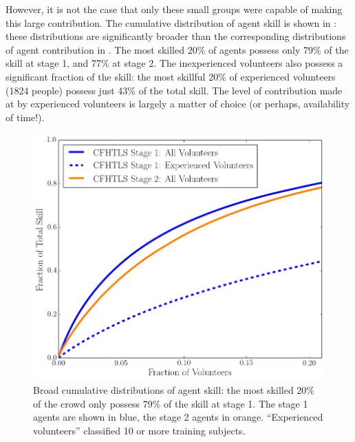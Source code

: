 \documentclass[useAMS,usenatbib,a4paper]{mn2e}
\begin{document}
However, it is not the case that only these small groups were capable of
making this large contribution.
The cumulative distribution of agent skill is shown in
: these distributions are significantly broader
than the corresponding distributions of agent contribution in 
. The most skilled 20\% of agents possess only  79\%
of the skill at stage 1, and 77\% at stage 2. The inexperienced volunteers
also possess a significant fraction of the skill: the most skillful 20\% of
experienced volunteers (1824 people)  possess just 43\% of the total skill.
The level of contribution made at \sw by experienced volunteers is largely a
matter of choice (or perhaps, availability of time!).

\begin{figure}
\centering\includegraphics[width=0.9\linewidth]{sw-system-figs/crowd_skill_cumul.png}
\caption{Broad cumulative distributions of agent skill: 
the most skilled 20\% of the crowd only possess 79\% of the skill at stage 1.
The stage 1 agents
are shown in blue, the stage 2 agents in orange. ``Experienced volunteers''
classified 10 or more training subjects.}
\label{fig:crowd:cumulskillplot}
\end{figure}
\end{document}
